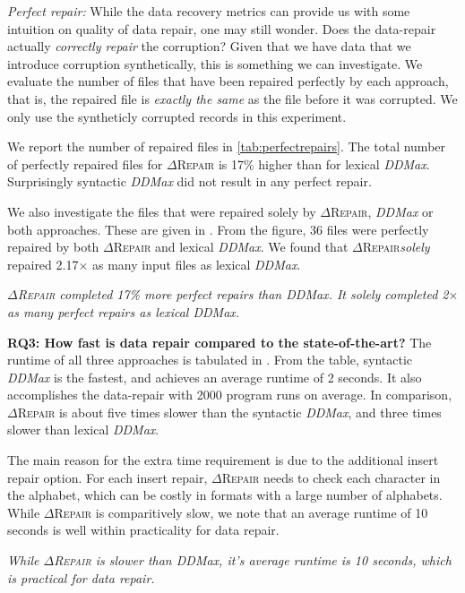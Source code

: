 \documentclass[acmsmall,screen,review,anonymous]{acmart}
\newenvironment{result}{\begin{framed}\centering\it}{\end{framed}}
\newcommand{\dtask}{data repair\xspace}
\newcommand{\approach}{\textsc{$\Delta$Repair}\xspace}
\newcommand{\ddmax}{\textit{DDMax}\xspace}
\newcommand{\drepair}{\approach}
\begin{document}
\noindent\emph{Perfect repair:} While the data recovery metrics can provide us
with some intuition on quality of data repair, one may still wonder. Does the
data-repair actually \emph{correctly repair} the corruption? Given that we have
data that we introduce corruption synthetically, this is something we can
investigate.
We evaluate the number of files that have been repaired perfectly by
each approach, that is, the repaired file is \emph{exactly the same} as the file
before it was corrupted.
We only use the syntheticly corrupted records in this
experiment.

We report the number of repaired files in \cref{tab:perfectrepairs}.
The total number of perfectly repaired files for \drepair is 17\%
higher than for lexical \ddmax. Surprisingly syntactic \ddmax did not
result in any perfect repair.

We also investigate the files that were repaired solely by \drepair, \ddmax 
or both approaches. These are given in .
From the figure, 36 files were perfectly repaired by both \drepair and lexical \ddmax.
We found that \drepair \emph{solely} repaired 2.17$\times$ as many input files
as lexical \ddmax.

\begin{result}
\approach completed 17\% more perfect repairs than \ddmax. It solely completed 2$\times$ as many perfect repairs 
as lexical \ddmax. 
\end{result}


\noindent\textbf{RQ3: How fast is \dtask compared to the state-of-the-art?}
The runtime of all three approaches is tabulated in .
From the table, syntactic \ddmax is the fastest, and achieves an average runtime
of 2 seconds. It also accomplishes the data-repair with 2000 program runs on
average. In comparison, \drepair is about five times slower than the syntactic
\ddmax, and three times slower than lexical \ddmax.

The main reason for the extra time requirement is due to the additional
insert repair option. For each insert repair, \drepair needs to check each
character in the alphabet, which can be costly in formats with a large number
of alphabets. While \drepair is comparitively slow, we note that an average
runtime of 10 seconds is well within practicality for \dtask.

\begin{result}
While \drepair is slower than \ddmax, it's average runtime is 10 seconds, which
is practical for \dtask.
\end{result}
\end{document}
